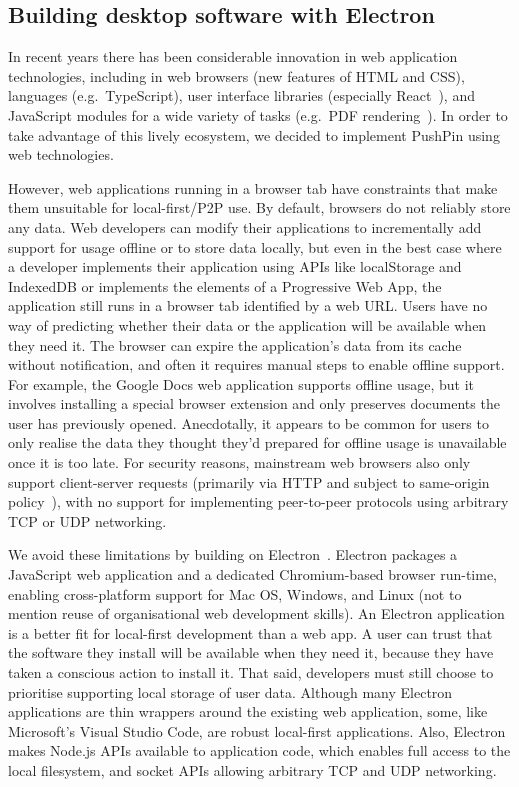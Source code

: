 \documentclass[sigplan,10pt]{acmart}
\begin{document}
\subsection{Building desktop software with Electron}

In recent years there has been considerable innovation in web application technologies, including in web browsers (new features of HTML and CSS), languages (e.g.\ TypeScript), user interface libraries (especially React~\cite{React}), and JavaScript modules for a wide variety of tasks (e.g.\ PDF rendering~\cite{PDFjs}).
In order to take advantage of this lively ecosystem, we decided to implement PushPin using web technologies.

However, web applications running in a browser tab have constraints that make them unsuitable for local-first/P2P use. By default, browsers do not reliably store any data. Web developers can modify their applications to incrementally add support for usage offline or to store data locally, but even in the best case where a developer implements their application using APIs like localStorage and IndexedDB or implements the elements of a Progressive Web App, the application still runs in a browser tab identified by a web URL. Users have no way of predicting whether their data or the application will be available when they need it. The browser can expire the application's data from its cache without notification, and often it requires manual steps to enable offline support. For example, the Google Docs web application supports offline usage, but it involves installing a special browser extension and only preserves documents the user has previously opened. Anecdotally, it appears to be common for users to only realise the data they thought they'd prepared for offline usage is unavailable once it is too late. For security reasons, mainstream web browsers also only support client-server requests (primarily via HTTP and subject to same-origin policy~\cite{SameOrigin}), with no support for implementing peer-to-peer protocols using arbitrary TCP or UDP networking.

We avoid these limitations by building on Electron~\cite{Electron}. Electron packages a JavaScript web application and a dedicated Chromium-based browser run-time, enabling cross-platform support for Mac OS, Windows, and Linux (not to mention reuse of organisational web development skills). An Electron application is a better fit for local-first development than a web app. A user can trust that the software they install will be available when they need it, because they have taken a conscious action to install it. That said, developers must still choose to prioritise supporting local storage of user data. Although many Electron applications are thin wrappers around the existing web application, some, like Microsoft's Visual Studio Code, are robust local-first applications. Also, Electron makes Node.js APIs available to application code, which enables full access to the local filesystem, and socket APIs allowing arbitrary TCP and UDP networking.
\end{document}
